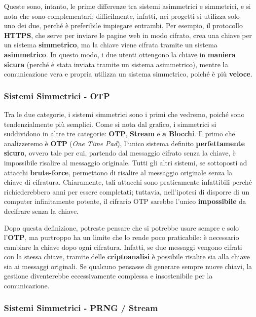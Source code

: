 \documentclass{rapport}
\begin{document}
Queste sono, intanto, le prime differenze tra sistemi asimmetrici e simmetrici, e si nota che sono complementari: difficilmente, infatti, nei progetti si utilizza solo uno dei due, perché è preferibile impiegare entrambi. Per esempio, il protocollo \textbf{HTTPS}, che serve per inviare le pagine web in modo cifrato, crea una chiave per un sistema \textbf{simmetrico}, ma la chiave viene cifrata tramite un sistema \textbf{asimmetrico}. In questo modo, i due utenti ottengono la chiave in \textbf{maniera sicura} (perché è stata inviata tramite un sistema asimmetrico), mentre la comunicazione vera e propria utilizza un sistema simmetrico, poiché è più \textbf{veloce}.

\newpage

\subsubsection{Sistemi Simmetrici - OTP}

Tra le due categorie, i sistemi simmetrici sono i primi che vedremo, poiché sono tendenzialmente più semplici. Come si nota dal grafico, i simmetrici si suddividono in altre tre categorie: \textbf{OTP}, \textbf{Stream} e \textbf{a Blocchi}. Il primo che analizzeremo è \textbf{OTP} (\textit{One Time Pad}), l’unico sistema definito \textbf{perfettamente sicuro}, ovvero tale per cui, partendo dal messaggio cifrato senza la chiave, è impossibile risalire al messaggio originale. Tutti gli altri sistemi, se sottoposti ad attacchi \textbf{brute-force}, permettono di risalire al messaggio originale senza la chiave di cifratura. Chiaramente, tali attacchi sono praticamente infattibili perché richiederebbero anni per essere completati; tuttavia, nell’ipotesi di disporre di un computer infinitamente potente, il cifrario OTP sarebbe l’unico \textbf{impossibile} da decifrare senza la chiave.

Dopo questa definizione, potreste pensare che si potrebbe usare sempre e solo l’\textbf{OTP}, ma purtroppo ha un limite che lo rende poco praticabile: è necessario cambiare la chiave dopo ogni cifratura. Infatti, se due messaggi vengono cifrati con la stessa chiave, tramite delle \textbf{criptoanalisi} è possibile risalire sia alla chiave sia ai messaggi originali. Se qualcuno pensasse di generare sempre nuove chiavi, la gestione diventerebbe eccessivamente complessa e insostenibile per la comunicazione.

\subsubsection{Sistemi Simmetrici - PRNG / Stream}
\end{document}
